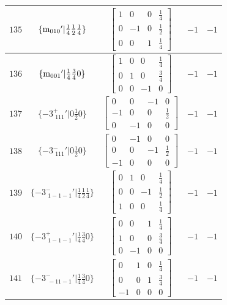 \documentclass[fleqn,8pt]{jsarticle}
\begin{document}
\begin{longtable}{ccccc}
$ 135 $ & $ \{{\rm m}_{010}{}'|\frac{1}{4} \frac{1}{2} \frac{1}{4}\} $ & $ \begin{bmatrix} 1 & 0 & 0 & \frac{1}{4} \\ 0 & -1 & 0 & \frac{1}{2} \\ 0 & 0 & 1 & \frac{1}{4} \end{bmatrix} $ & $ -1 $ & $ -1 $ \\ \hline
$ 136 $ & $ \{{\rm m}_{001}{}'|\frac{1}{4} \frac{3}{4} 0\} $ & $ \begin{bmatrix} 1 & 0 & 0 & \frac{1}{4} \\ 0 & 1 & 0 & \frac{3}{4} \\ 0 & 0 & -1 & 0 \end{bmatrix} $ & $ -1 $ & $ -1 $ \\ \hline
$ 137 $ & $ \{-3^{+}_{\,\,111}{}'|0 \frac{1}{2} 0\} $ & $ \begin{bmatrix} 0 & 0 & -1 & 0 \\ -1 & 0 & 0 & \frac{1}{2} \\ 0 & -1 & 0 & 0 \end{bmatrix} $ & $ -1 $ & $ -1 $ \\ \hline
$ 138 $ & $ \{-3^{-}_{\,\,111}{}'|0 \frac{1}{2} 0\} $ & $ \begin{bmatrix} 0 & -1 & 0 & 0 \\ 0 & 0 & -1 & \frac{1}{2} \\ -1 & 0 & 0 & 0 \end{bmatrix} $ & $ -1 $ & $ -1 $ \\ \hline
$ 139 $ & $ \{-3^{-}_{\,\,1-1-1}{}'|\frac{1}{4} \frac{1}{2} \frac{1}{4}\} $ & $ \begin{bmatrix} 0 & 1 & 0 & \frac{1}{4} \\ 0 & 0 & -1 & \frac{1}{2} \\ 1 & 0 & 0 & \frac{1}{4} \end{bmatrix} $ & $ -1 $ & $ -1 $ \\ \hline
$ 140 $ & $ \{-3^{+}_{\,\,1-1-1}{}'|\frac{1}{4} \frac{3}{4} 0\} $ & $ \begin{bmatrix} 0 & 0 & 1 & \frac{1}{4} \\ 1 & 0 & 0 & \frac{3}{4} \\ 0 & -1 & 0 & 0 \end{bmatrix} $ & $ -1 $ & $ -1 $ \\ \hline
$ 141 $ & $ \{-3^{-}_{\,\,-11-1}{}'|\frac{1}{4} \frac{3}{4} 0\} $ & $ \begin{bmatrix} 0 & 1 & 0 & \frac{1}{4} \\ 0 & 0 & 1 & \frac{3}{4} \\ -1 & 0 & 0 & 0 \end{bmatrix} $ & $ -1 $ & $ -1 $ \\ \hline

\end{longtable}
\end{document}
